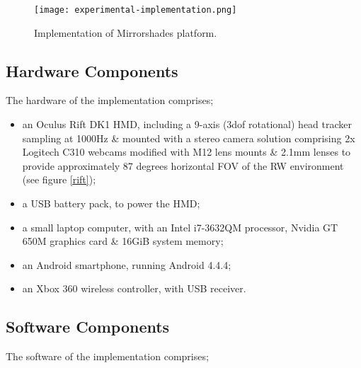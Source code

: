 \begin{figure}[h]
	\thispagestyle{empty}
	\begin{center}
		\texttt{[image: experimental-implementation.png]}
		\caption{Implementation of Mirrorshades platform.}
		\label{experimentalimplementation}
	\end{center}
\end{figure}


\subsection{Hardware Components}
The hardware of the implementation comprises;

\begin{itemize}
	\item an Oculus Rift DK1 HMD, including a 9-axis (3dof rotational) head tracker sampling at 1000Hz \& mounted with a stereo camera solution comprising 2x Logitech C310 webcams modified with M12 lens mounts \& 2.1mm lenses to provide approximately 87 degrees horizontal FOV of the RW environment (see figure \ref{rift});
	\item a USB battery pack, to power the HMD;
	\item a small laptop computer, with an Intel i7-3632QM processor, Nvidia GT 650M graphics card \& 16GiB system memory;
	\item an Android smartphone, running Android 4.4.4;
	\item an Xbox 360 wireless controller, with USB receiver.
\end{itemize}



\subsection{Software Components}
The software of the implementation comprises;

